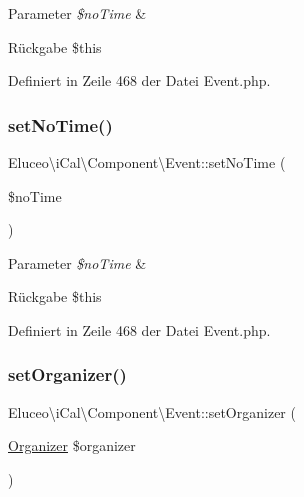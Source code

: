 \begin{DoxyParams}{Parameter}
{\em \$no\+Time} & \\
\hline
\end{DoxyParams}
\begin{DoxyReturn}{Rückgabe}
\$this 
\end{DoxyReturn}


Definiert in Zeile 468 der Datei Event.\+php.

\mbox{\label{class_eluceo_1_1i_cal_1_1_component_1_1_event_a313bef4a402da42f644ac0dc3bafe586}} 
\subsubsection{\texorpdfstring{set\+No\+Time()}{setNoTime()}\hspace{0.1cm}{\footnotesize\ttfamily [3/3]}}
{\footnotesize\ttfamily Eluceo\textbackslash{}i\+Cal\textbackslash{}\+Component\textbackslash{}\+Event\+::set\+No\+Time (\begin{DoxyParamCaption}\item[{}]{\$no\+Time }\end{DoxyParamCaption})}


\begin{DoxyParams}{Parameter}
{\em \$no\+Time} & \\
\hline
\end{DoxyParams}
\begin{DoxyReturn}{Rückgabe}
\$this 
\end{DoxyReturn}


Definiert in Zeile 468 der Datei Event.\+php.

\mbox{\label{class_eluceo_1_1i_cal_1_1_component_1_1_event_a62d9b8061a582bb16162bea9d5ddbb40}} 
\subsubsection{\texorpdfstring{set\+Organizer()}{setOrganizer()}\hspace{0.1cm}{\footnotesize\ttfamily [1/3]}}
{\footnotesize\ttfamily Eluceo\textbackslash{}i\+Cal\textbackslash{}\+Component\textbackslash{}\+Event\+::set\+Organizer (\begin{DoxyParamCaption}\item[{\mbox{\hyperlink{class_eluceo_1_1i_cal_1_1_property_1_1_event_1_1_organizer}{Organizer}}}]{\$organizer }\end{DoxyParamCaption})}


